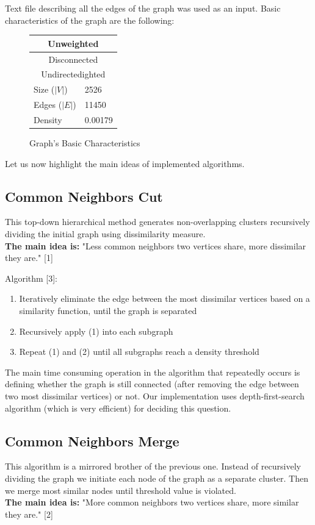 \documentclass[journal]{IEEEtran}
\begin{document}
Text file describing all the edges of the graph was used as an input. Basic characteristics of the graph are the following:
\begin{figure}[h!]
\begin{center}
	\begin{tabular}{ | l | l |}
		\hline
		\multicolumn{2}{|c|}{Unweighted} \\ \hline
		\multicolumn{2}{|c|}{Disconnected} \\ \hline
		\multicolumn{2}{|c|}{Undirectedighted} \\ \hline
		Size ($|V|$)  & 2526  \\ \hline
		Edges ($|E|$) & 11450 \\ \hline
		Density & 0.00179  \\
		\hline
	\end{tabular}
\end{center}
\caption{Graph's Basic Characteristics}
\end{figure}
Let us now highlight the main ideas of implemented algorithms.

\subsection{Common Neighbors Cut}
This top-down hierarchical method generates non-overlapping clusters recursively dividing the initial graph using dissimilarity measure. \\
\textbf{The main idea is:} "Less common neighbors two vertices share, more dissimilar they are." [1]

Algorithm [3]:
\begin{enumerate}
	\item Iteratively eliminate the edge between the most dissimilar vertices
	based on a similarity function, until the graph is separated
	\item Recursively apply (1) into each subgraph
	\item Repeat (1) and (2) until all subgraphs reach a density threshold
\end{enumerate}

The main time consuming operation in the algorithm that repeatedly occurs is defining whether the graph is still connected (after removing the edge between two most dissimilar vertices) or not. Our implementation uses depth-first-search algorithm (which is very efficient) for deciding this question. 

\subsection{Common Neighbors Merge}
This algorithm is a mirrored brother of the previous one. Instead of recursively dividing the graph we initiate each node of the graph as a separate cluster. Then we merge most similar nodes until threshold value is violated. \\
\textbf{The main idea is:} "More common neighbors two vertices share, more similar they are." [2]
\end{document}
